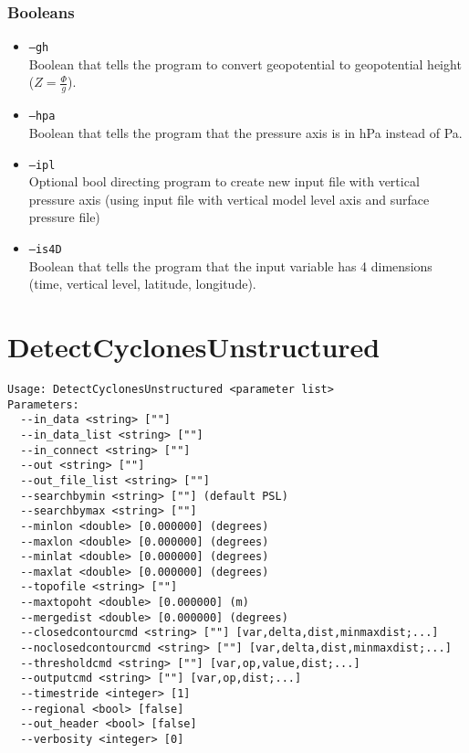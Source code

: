 \documentclass{article}
\begin{document}
\subsubsection{Booleans}
\begin{itemize}
\item[] \texttt{--gh}\\Boolean that tells the program to convert geopotential to geopotential height ($Z=\frac{\Phi}{g}$).
\item[] \texttt{--hpa}\\Boolean that tells the program that the pressure axis is in hPa instead of Pa.
\item[]\texttt{--ipl}\\ Optional bool directing program to create new input file with vertical pressure axis (using input file with vertical model level axis and surface pressure file)
\item[] \texttt{--is4D}\\Boolean that tells the program that the input variable has 4 dimensions (time, vertical level, latitude, longitude).
\end{itemize}

\section{DetectCyclonesUnstructured}

\begin{verbatim}
Usage: DetectCyclonesUnstructured <parameter list>
Parameters:
  --in_data <string> [""] 
  --in_data_list <string> [""]
  --in_connect <string> [""] 
  --out <string> [""] 
  --out_file_list <string> [""]
  --searchbymin <string> [""] (default PSL)
  --searchbymax <string> [""] 
  --minlon <double> [0.000000] (degrees)
  --maxlon <double> [0.000000] (degrees)
  --minlat <double> [0.000000] (degrees)
  --maxlat <double> [0.000000] (degrees)
  --topofile <string> [""] 
  --maxtopoht <double> [0.000000] (m)
  --mergedist <double> [0.000000] (degrees)
  --closedcontourcmd <string> [""] [var,delta,dist,minmaxdist;...]
  --noclosedcontourcmd <string> [""] [var,delta,dist,minmaxdist;...]
  --thresholdcmd <string> [""] [var,op,value,dist;...]
  --outputcmd <string> [""] [var,op,dist;...]
  --timestride <integer> [1] 
  --regional <bool> [false] 
  --out_header <bool> [false] 
  --verbosity <integer> [0] 
\end{verbatim}
\end{document}
